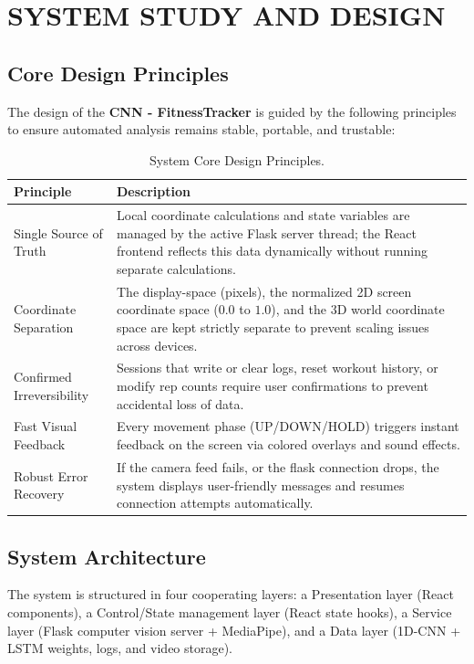 \chapter{SYSTEM STUDY AND DESIGN}

\section{Core Design Principles}
The design of the \textbf{CNN - FitnessTracker} is guided by the following principles to ensure automated analysis remains stable, portable, and trustable:
\begin{table}[h]
\centering
\begin{tabular}{|p{3.5cm}|p{12.3cm}|}
\hline
\textbf{Principle} & \textbf{Description} \\ \hline
Single Source of Truth & Local coordinate calculations and state variables are managed by the active Flask server thread; the React frontend reflects this data dynamically without running separate calculations. \\ \hline
Coordinate Separation & The display-space (pixels), the normalized 2D screen coordinate space ($0.0$ to $1.0$), and the 3D world coordinate space are kept strictly separate to prevent scaling issues across devices. \\ \hline
Confirmed Irreversibility & Sessions that write or clear logs, reset workout history, or modify rep counts require user confirmations to prevent accidental loss of data. \\ \hline
Fast Visual Feedback & Every movement phase (UP/DOWN/HOLD) triggers instant feedback on the screen via colored overlays and sound effects. \\ \hline
Robust Error Recovery & If the camera feed fails, or the flask connection drops, the system displays user-friendly messages and resumes connection attempts automatically. \\ \hline
\end{tabular}
\caption{System Core Design Principles.}
\label{tab:core_design_principles}
\end{table}

\section{System Architecture}
The system is structured in four cooperating layers: a Presentation layer (React components), a Control/State management layer (React state hooks), a Service layer (Flask computer vision server + MediaPipe), and a Data layer (1D-CNN + LSTM weights, logs, and video storage). 

